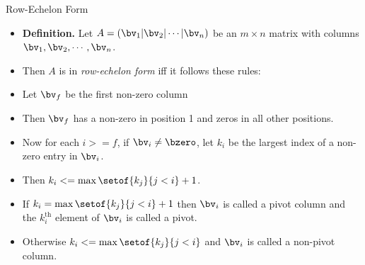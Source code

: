 \documentclass{beamer}
\begin{document}

\begin{frame}{Row-Echelon Form}

\begin{itemize}
\item \textbf{Definition.} Let $A = \left(\bv_1 \vert \bv_2 \vert \cdots \vert \bv_n\right)$
be an $m\times n$ matrix with columns $\bv_1,\bv_2,\cdots,\bv_n$.
\item Then $A$ is in \emph{row-echelon form} iff it follows these rules:
\item Let $\bv_f$ be the first non-zero column
\item Then $\bv_f$ has a non-zero in position 1 and zeros
in all other positions.
\item Now for each $i>=f$, if $\bv_i\not=\bzero$, let $k_i$ be the largest index of a non-zero entry in $\bv_i$.
\item Then $k_i<=\max \setof{k_j}{j<i} +1$.
\item If $k_i=\max \setof{k_j}{j<i} +1$ then $\bv_i$ is called a pivot column and the $k_i^{\text{th}}$ element
of $\bv_i$ is called a pivot.
\item Otherwise $k_i<= \max \setof{k_j}{j<i}$ and $\bv_i$ is called a non-pivot column.

\end{itemize}

\end{frame}


\end{document}
